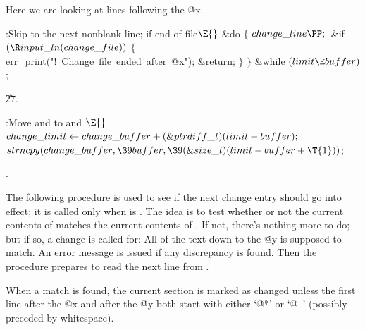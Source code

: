 Here we are looking at lines following the \.{@x}.

\Y\B\4:Skip to the next nonblank line;  if end of file\X${}%
\E{}$\6
\&{do}\5
${}\{{}$\1\6
${}\\{change\_line}\PP;{}$\6
\&{if} ${}(\R\\{input\_ln}(\\{change\_file})){}$\5
${}\{{}$\1\6
\\{err\_print}(\.{"!\ Change\ file\ ended}\)\.{\ after\ @x"});\6
\&{return};\6
\4${}\}{}$\2\6
\4${}\}{}$\2\5
\&{while} ${}(\\{limit}\E\\{buffer}){}$;\par
\U27.\fi

\B{}:Move  and  to 
and \X${}\E{}$\6
$\\{change\_limit}\K\\{change\_buffer}+(\&{ptrdiff\_t})(\\{limit}-%
\\{buffer});{}$\6
${}\\{strncpy}(\\{change\_buffer},\39\\{buffer},\39(\&{size\_t})(\\{limit}-%
\\{buffer}+\T{1})){}$;\par
{}.\fi

The following procedure is used to see if the next change entry should
go into effect; it is called only when  is .
The idea is to test whether or not the current
contents of  matches the current contents of .
If not, there's nothing more to do; but if so, a change is called for:
All of the text down to the \.{@y} is supposed to match. An error
message is issued if any discrepancy is found. Then the procedure
prepares to read the next line from .

When a match is found, the current section is marked as changed unless
the first line after the \.{@x} and after the \.{@y} both start with
either `\.{@*}' or `\.{@\ }' (possibly preceded by whitespace).

